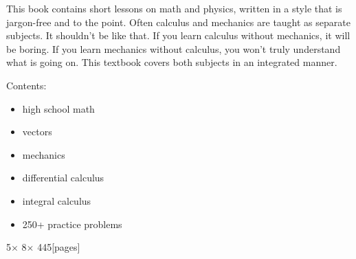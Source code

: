 \documentclass[9pt]{IEEEtran}
\begin{document}
    This book contains short lessons on math and physics,
    written in a style that is jargon-free and to the point.
    Often calculus and mechanics are taught as separate subjects.
    It shouldn't be like that.
    If you learn calculus without mechanics, it will be boring.
    If you learn mechanics without calculus, you won't truly understand what is going on.
    This textbook covers both subjects in an integrated manner.
    
Contents:
\begin{itemize}
  \item {\sc high school math}%
  \item {\sc vectors}%
  \item {\sc mechanics} 
  \item {\sc differential calculus}%
  \item {\sc integral calculus}%
  \item 250+ practice problems %
\end{itemize}

\noindent
  \hfill {\small   5\textonehalf[in] $\times$ 8\textonehalf[in] $\times$ 445[pages] } 




\end{document}
